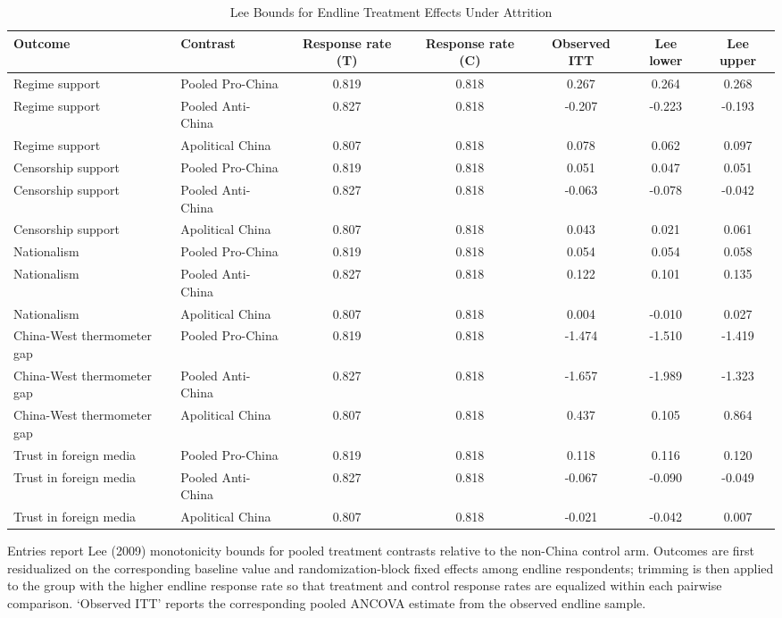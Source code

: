 \begin{table}[H]
\centering
\caption{Lee Bounds for Endline Treatment Effects Under Attrition}
\label{tab:lee_bounds_t1}
\footnotesize
\begin{threeparttable}
\begin{tabular}{llccccc}
\toprule
Outcome & Contrast & Response rate (T) & Response rate (C) & Observed ITT & Lee lower & Lee upper \\
\midrule
Regime support & Pooled Pro-China & 0.819 & 0.818 & 0.267 & 0.264 & 0.268 \\
Regime support & Pooled Anti-China & 0.827 & 0.818 & -0.207 & -0.223 & -0.193 \\
Regime support & Apolitical China & 0.807 & 0.818 & 0.078 & 0.062 & 0.097 \\
Censorship support & Pooled Pro-China & 0.819 & 0.818 & 0.051 & 0.047 & 0.051 \\
Censorship support & Pooled Anti-China & 0.827 & 0.818 & -0.063 & -0.078 & -0.042 \\
Censorship support & Apolitical China & 0.807 & 0.818 & 0.043 & 0.021 & 0.061 \\
Nationalism & Pooled Pro-China & 0.819 & 0.818 & 0.054 & 0.054 & 0.058 \\
Nationalism & Pooled Anti-China & 0.827 & 0.818 & 0.122 & 0.101 & 0.135 \\
Nationalism & Apolitical China & 0.807 & 0.818 & 0.004 & -0.010 & 0.027 \\
China-West thermometer gap & Pooled Pro-China & 0.819 & 0.818 & -1.474 & -1.510 & -1.419 \\
China-West thermometer gap & Pooled Anti-China & 0.827 & 0.818 & -1.657 & -1.989 & -1.323 \\
China-West thermometer gap & Apolitical China & 0.807 & 0.818 & 0.437 & 0.105 & 0.864 \\
Trust in foreign media & Pooled Pro-China & 0.819 & 0.818 & 0.118 & 0.116 & 0.120 \\
Trust in foreign media & Pooled Anti-China & 0.827 & 0.818 & -0.067 & -0.090 & -0.049 \\
Trust in foreign media & Apolitical China & 0.807 & 0.818 & -0.021 & -0.042 & 0.007 \\
\bottomrule
\end{tabular}
\begin{tablenotes}[flushleft]
\footnotesize
\item Entries report Lee (2009) monotonicity bounds for pooled treatment contrasts relative to the non-China control arm. Outcomes are first residualized on the corresponding baseline value and randomization-block fixed effects among endline respondents; trimming is then applied to the group with the higher endline response rate so that treatment and control response rates are equalized within each pairwise comparison. `Observed ITT' reports the corresponding pooled ANCOVA estimate from the observed endline sample.
\end{tablenotes}
\end{threeparttable}
\end{table}
